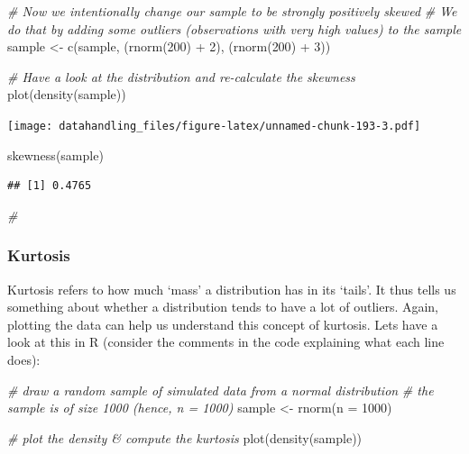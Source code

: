 \documentclass[
  12pt,
]{style/krantz}
\newenvironment{Shaded}{\begin{snugshade}}{\end{snugshade}}
\newcommand{\AttributeTok}[1]{\textcolor[rgb]{0.77,0.63,0.00}{#1}}
\newcommand{\CommentTok}[1]{\textcolor[rgb]{0.56,0.35,0.01}{\textit{#1}}}
\newcommand{\DecValTok}[1]{\textcolor[rgb]{0.00,0.00,0.81}{#1}}
\newcommand{\FunctionTok}[1]{\textcolor[rgb]{0.00,0.00,0.00}{#1}}
\newcommand{\NormalTok}[1]{#1}
\newcommand{\OtherTok}[1]{\textcolor[rgb]{0.56,0.35,0.01}{#1}}
\newcommand{\SpecialCharTok}[1]{\textcolor[rgb]{0.00,0.00,0.00}{#1}}
\begin{document}
\begin{Shaded}
\begin{Highlighting}[]
\CommentTok{\# Now we intentionally change our sample to be strongly positively skewed}
\CommentTok{\# We do that by adding some outliers (observations with very high values) to the sample }
\NormalTok{sample }\OtherTok{\textless{}{-}} \FunctionTok{c}\NormalTok{(sample, (}\FunctionTok{rnorm}\NormalTok{(}\DecValTok{200}\NormalTok{) }\SpecialCharTok{+} \DecValTok{2}\NormalTok{), (}\FunctionTok{rnorm}\NormalTok{(}\DecValTok{200}\NormalTok{) }\SpecialCharTok{+} \DecValTok{3}\NormalTok{))}

\CommentTok{\# Have a look at the distribution and re{-}calculate the skewness}
\FunctionTok{plot}\NormalTok{(}\FunctionTok{density}\NormalTok{(sample))}
\end{Highlighting}
\end{Shaded}

\texttt{[image: datahandling\_files/figure-latex/unnamed-chunk-193-3.pdf]}

\begin{Shaded}
\begin{Highlighting}[]
\FunctionTok{skewness}\NormalTok{(sample)}
\end{Highlighting}
\end{Shaded}

\begin{verbatim}
## [1] 0.4765
\end{verbatim}

\begin{Shaded}
\begin{Highlighting}[]
\CommentTok{\#}
\end{Highlighting}
\end{Shaded}

\hypertarget{kurtosis}{%
\subsubsection{Kurtosis}\label{kurtosis}}

Kurtosis refers to how much `mass' a distribution has in its `tails'. It thus tells us something about whether a distribution tends to have a lot of outliers. Again, plotting the data can help us understand this concept of kurtosis. Lets have a look at this in R (consider the comments in the code explaining what each line does):

\begin{Shaded}
\begin{Highlighting}[]
\CommentTok{\# draw a random sample of simulated data from a normal distribution}
\CommentTok{\# the sample is of size 1000 (hence, n = 1000)}
\NormalTok{sample }\OtherTok{\textless{}{-}} \FunctionTok{rnorm}\NormalTok{(}\AttributeTok{n =} \DecValTok{1000}\NormalTok{)}

\CommentTok{\# plot the density \& compute the kurtosis}
\FunctionTok{plot}\NormalTok{(}\FunctionTok{density}\NormalTok{(sample))}
\end{Highlighting}
\end{Shaded}
\end{document}
